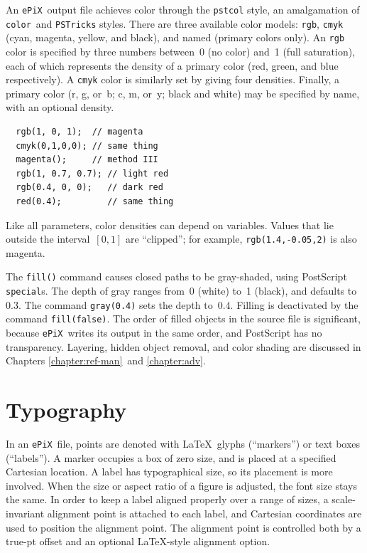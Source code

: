 \documentclass[12pt]{report}
\newcommand{\code}[1]{\texttt{#1}}
\newcommand{\ePiX}{\code{ePiX}}
\begin{document}
An \ePiX\ output file achieves color through the \code{pstcol} style,
an amalgamation of \code{color}~and \code{PSTricks} styles. There are
three available color models: \code{rgb}, \code{cmyk} (cyan, magenta,
yellow, and black), and named (primary colors only). An \code{rgb}
color is specified by three numbers between~0 (no color) and~1 (full
saturation), each of which represents the density of a primary color
(red, green, and blue respectively). A \code{cmyk} color is similarly
set by giving four densities. Finally, a primary color (r, g, or~b; c,
m, or~y; black and white) may be specified by name, with an optional
density.
\begin{verbatim}
  rgb(1, 0, 1);  // magenta
  cmyk(0,1,0,0); // same thing
  magenta();     // method III
  rgb(1, 0.7, 0.7); // light red
  rgb(0.4, 0, 0);   // dark red
  red(0.4);         // same thing
\end{verbatim}
Like all parameters, color densities can depend on variables. Values
that lie outside the interval~$[0,1]$ are ``clipped''; for example,
\code{rgb(1.4,-0.05,2)} is also magenta.

The \code{fill()} command causes closed paths to be gray-shaded, using
Post\-Script \code{special}s. The depth of gray ranges from~0 (white)
to~1 (black), and defaults to~$0.3$. The command \code{gray(0.4)} sets
the depth to~$0.4$.  Filling is deactivated by the command
\code{fill(false)}. The order of filled objects in the source file is
significant, because \ePiX\ writes its output in the same order, and
PostScript has no transparency. Layering, hidden object removal, and
color shading are discussed in Chapters \ref{chapter:ref-man}~and
\ref{chapter:adv}.


\section{Typography}

In an \ePiX\ file, points are denoted with \LaTeX\ glyphs
(``markers'') or text boxes (``labels''). A marker occupies a box of
zero size, and is placed at a specified Cartesian location. A label
has typographical size, so its placement is more involved.  When the
size or aspect ratio of a figure is adjusted, the
font size stays the same. In order to keep a label aligned properly
over a range of sizes, a scale-invariant alignment point is attached
to each label, and Cartesian coordinates are used to position the
alignment point. The alignment point is controlled both by a true-pt
offset and an optional \LaTeX-style alignment option.
\end{document}
